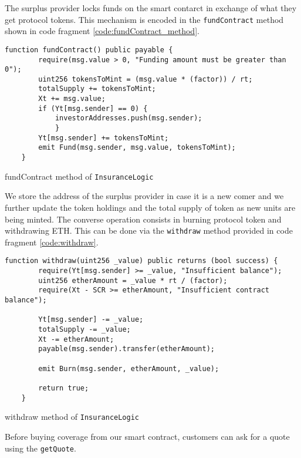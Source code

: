 \documentclass[10pt]{article}
\begin{document}
The surplus provider locks funds on the smart contarct in exchange of what they get protocol tokens. This mechanism is encoded in the \texttt{fundContract} method shown in code fragment \ref{code:fundContract_method}.


\begin{codefragment}[!h]
\begin{lstlisting}[language=Solidity]
function fundContract() public payable {
        require(msg.value > 0, "Funding amount must be greater than 0");
        uint256 tokensToMint = (msg.value * (factor)) / rt;
        totalSupply += tokensToMint;
        Xt += msg.value;
        if (Yt[msg.sender] == 0) {
            investorAddresses.push(msg.sender);
            }
        Yt[msg.sender] += tokensToMint;
        emit Fund(msg.sender, msg.value, tokensToMint);
    }
        \end{lstlisting}
    \caption{fundContract method of \texttt{InsuranceLogic}}
    \label{code:fundContract_method}
\end{codefragment}

We store the address of the surplus provider in case it is a new comer and we further update the token holdings and the total supply of token as new units are being minted. The converse operation consists in burning protocol token and withdrawing ETH. This can be done via the \texttt{withdraw} method provided in code fragment \ref{code:withdraw}.

\begin{codefragment}[!h]
\begin{lstlisting}[language=Solidity]
 function withdraw(uint256 _value) public returns (bool success) {
        require(Yt[msg.sender] >= _value, "Insufficient balance");
        uint256 etherAmount = _value * rt / (factor);
        require(Xt - SCR >= etherAmount, "Insufficient contract balance");

        Yt[msg.sender] -= _value;
        totalSupply -= _value;
        Xt -= etherAmount;
        payable(msg.sender).transfer(etherAmount);

        emit Burn(msg.sender, etherAmount, _value);
        
        return true;
    }
\end{lstlisting}
    \caption{withdraw method of \texttt{InsuranceLogic}}
    \label{code:withdraw_method}
\end{codefragment}

Before buying coverage from our smart contract, customers can ask for a quote using the \texttt{getQuote}.
\end{document}
